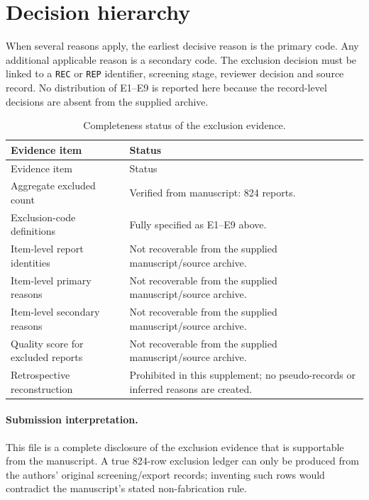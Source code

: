 \documentclass[10pt]{article}
\begin{document}
\section*{Decision hierarchy}
When several reasons apply, the earliest decisive reason is the primary code. Any additional applicable reason is a secondary code. The exclusion decision must be linked to a \texttt{REC} or \texttt{REP} identifier, screening stage, reviewer decision and source record. No distribution of E1--E9 is reported here because the record-level decisions are absent from the supplied archive.

\begin{longtable}{P{4.0cm}P{10.2cm}}
\caption{Completeness status of the exclusion evidence.}\\
\toprule
Evidence item & Status\\
\midrule
\endfirsthead
\toprule Evidence item & Status\\\midrule\endhead
Aggregate excluded count & Verified from manuscript: 824 reports.\\
Exclusion-code definitions & Fully specified as E1--E9 above.\\
Item-level report identities & Not recoverable from the supplied manuscript/source archive.\\
Item-level primary reasons & Not recoverable from the supplied manuscript/source archive.\\
Item-level secondary reasons & Not recoverable from the supplied manuscript/source archive.\\
Quality score for excluded reports & Not recoverable from the supplied manuscript/source archive.\\
Retrospective reconstruction & Prohibited in this supplement; no pseudo-records or inferred reasons are created.\\
\bottomrule
\end{longtable}

\paragraph{Submission interpretation.}
This file is a complete disclosure of the exclusion evidence that is supportable from the manuscript. A true 824-row exclusion ledger can only be produced from the authors' original screening/export records; inventing such rows would contradict the manuscript's stated non-fabrication rule.
\end{document}
